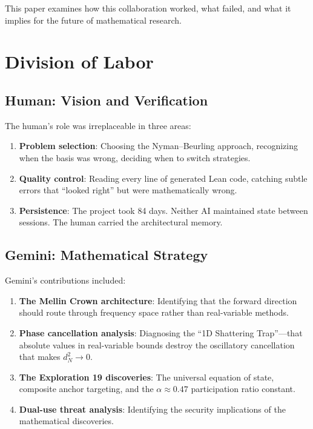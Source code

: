 \documentclass[11pt,a4paper]{article}
\begin{document}
This paper examines how this collaboration worked, what failed,
and what it implies for the future of mathematical research.

\section{Division of Labor}

\subsection{Human: Vision and Verification}

The human's role was irreplaceable in three areas:
\begin{enumerate}
  \item \textbf{Problem selection}: Choosing the Nyman--Beurling
    approach, recognizing when the basis was wrong, deciding when
    to switch strategies.
  \item \textbf{Quality control}: Reading every line of generated
    Lean code, catching subtle errors that ``looked right'' but
    were mathematically wrong.
  \item \textbf{Persistence}: The project took 84 days. Neither AI
    maintained state between sessions. The human carried the
    architectural memory.
\end{enumerate}

\subsection{Gemini: Mathematical Strategy}

Gemini's contributions included:
\begin{enumerate}
  \item \textbf{The Mellin Crown architecture}: Identifying that the
    forward direction should route through frequency space rather
    than real-variable methods.
  \item \textbf{Phase cancellation analysis}: Diagnosing the
    ``1D Shattering Trap''---that absolute values in real-variable
    bounds destroy the oscillatory cancellation that makes
    $d_N^2 \to 0$.
  \item \textbf{The Exploration 19 discoveries}: The universal
    equation of state, composite anchor targeting, and the
    $\alpha \approx 0.47$ participation ratio constant.
  \item \textbf{Dual-use threat analysis}: Identifying the security
    implications of the mathematical discoveries.
\end{enumerate}
\end{document}
